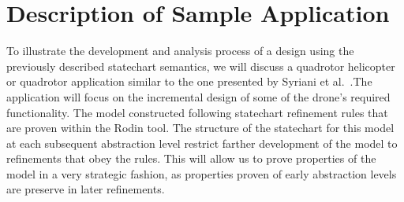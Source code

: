 

\section{Description of Sample Application}

To illustrate the development and analysis process of a design using the previously described 
statechart semantics, we will discuss a quadrotor helicopter or quadrotor application similar to 
the one presented by Syriani et al.~\cite{Syriani_2019}.The application will focus on the incremental 
design of some of the drone's required functionality.
The model constructed following statechart refinement rules that are proven within the Rodin tool.
The structure of the statechart for this model at each subsequent abstraction level restrict farther 
development of the model to refinements that obey the rules. This will allow us to prove properties 
of the model in a very strategic fashion, as properties proven of early abstraction levels 
are preserve in later refinements.

